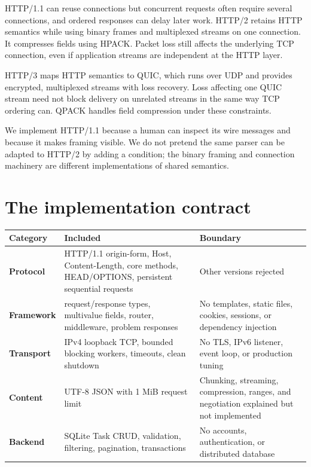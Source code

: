 HTTP/1.1 can reuse connections but concurrent requests often require several
connections, and ordered responses can delay later work. HTTP/2 retains HTTP
semantics while using binary frames and multiplexed streams on one connection.
It compresses fields using HPACK. Packet loss still affects the underlying TCP
connection, even if application streams are independent at the HTTP layer.

HTTP/3 maps HTTP semantics to QUIC, which runs over UDP and provides encrypted,
multiplexed streams with loss recovery. Loss affecting one QUIC stream need not
block delivery on unrelated streams in the same way TCP ordering can. QPACK
handles field compression under these constraints.

We implement HTTP/1.1 because a human can inspect its wire messages and because
it makes framing visible. We do not pretend the same parser can be adapted to
HTTP/2 by adding a condition; the binary framing and connection machinery are
different implementations of shared semantics.

\section{The implementation contract}

\begin{center}
\begin{tabularx}{\textwidth}{@{}>{\bfseries}p{30mm} X X@{}}
\toprule
Category & Included & Boundary \\
\midrule
Protocol & HTTP/1.1 origin-form, Host, Content-Length, core methods, HEAD/OPTIONS, persistent sequential requests & Other versions rejected \\
Framework & request/response types, multivalue fields, router, middleware, problem responses & No templates, static files, cookies, sessions, or dependency injection \\
Transport & IPv4 loopback TCP, bounded blocking workers, timeouts, clean shutdown & No TLS, IPv6 listener, event loop, or production tuning \\
Content & UTF-8 JSON with 1 MiB request limit & Chunking, streaming, compression, ranges, and negotiation explained but not implemented \\
Backend & SQLite Task CRUD, validation, filtering, pagination, transactions & No accounts, authentication, or distributed database \\
\bottomrule
\end{tabularx}
\end{center}

